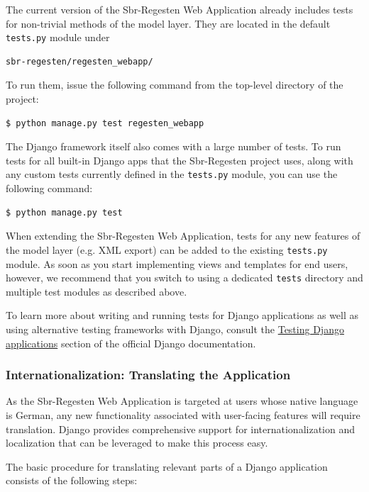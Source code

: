 The current version of the Sbr-Regesten Web Application already
includes tests for non-trivial methods of the model layer. They are
located in the default \texttt{tests.py} module under

\begin{verbatim}
sbr-regesten/regesten_webapp/
\end{verbatim}

To run them, issue the following command from the top-level directory
of the project:

\begin{verbatim}
$ python manage.py test regesten_webapp
\end{verbatim}

The Django framework itself also comes with a large number of tests.
To run tests for all built-in Django apps that the Sbr-Regesten
project uses, along with any custom tests currently defined in the
\texttt{tests.py} module, you can use the following command:

\begin{verbatim}
$ python manage.py test
\end{verbatim}

When extending the Sbr-Regesten Web Application, tests for any new
features of the model layer (e.g. XML export) can be added to the
existing \texttt{tests.py} module. As soon as you start implementing
views and templates for end users, however, we recommend that you
switch to using a dedicated \texttt{tests} directory and multiple test
modules as described above.

To learn more about writing and running tests for Django applications
as well as using alternative testing frameworks with Django, consult
the
\href{https://docs.djangoproject.com/en/1.4/topics/testing/}{Testing
  Django applications} section of the official Django documentation.

\subsubsection{Internationalization: Translating the Application}
\label{sec:translate}

As the Sbr-Regesten Web Application is targeted at users whose native
language is German, any new functionality associated with user-facing
features will require translation. Django provides comprehensive
support for internationalization and localization that can be
leveraged to make this process easy.

The basic procedure for translating relevant parts of a Django
application consists of the following steps:

